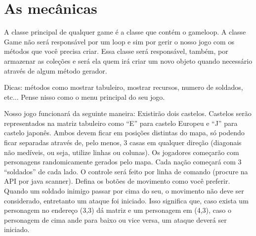 \documentclass{article}
\begin{document}
\section*{As mecânicas}
A classe principal de qualquer game é a classe que contém o gameloop. A
classe Game não será responsável por um loop e sim por gerir o nosso jogo com os métodos que você precisa criar. Essa classe será responsável, também, por armazenar as coleções e será ela quem irá criar um novo objeto quando necessário através de algum método gerador. 
\par Dicas: métodos como mostrar tabuleiro, mostrar recursos, numero de soldados, etc... Pense nisso como o menu principal do seu jogo.
\par Nosso jogo funcionará da seguinte maneira: Existirão dois castelos. Castelos serão representados na matriz tabuleiro como “E” para castelo Europeu e “J” para castelo japonês. Ambos devem ficar em posições distintas do mapa, só podendo ficar separadas através de, pelo menos, 3
casas em qualquer direção (diagonais não medíveis, ou seja, utilize linhas ou colunas). Os jogadores começarão com personagens randomicamente gerados pelo mapa. Cada nação começará com 3 “soldados” de cada lado. O controle será feito por linha de comando (procure na API por java scanner). Defina os botões de movimento como você preferir. Quando um soldado inimigo passar por cima do seu, o movimento não deve ser considerado, entretanto um ataque foi iniciado. Isso significa que, caso exista um personagem no endereço (3,3) dá matriz e um personagem em (4,3), caso o personagem​ de cima ande​ para​ baixo​ ou vice​ versa, um ataque deverá​ ser iniciado.
\end{document}
